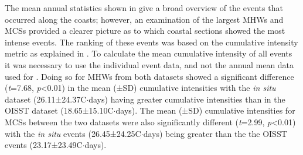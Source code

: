 \documentclass[a4paper,10pt,review]{elsarticle}
\begin{document}
The mean annual statistics shown in  give a broad overview of the events that occurred along the coasts; however, an examination of the largest MHWs and MCSs provided a clearer picture as to which coastal sections showed the most intense events. The ranking of these events was based on the cumulative intensity metric as explained in . To calculate the mean cumulative intensity of all events it was necessary to use the individual event data, and not the annual mean data used for . Doing so for MHWs from both datasets showed a significant difference (\emph{t}=7.68, \emph{p}<0.01) in the mean (±SD) cumulative intensities with the \emph{in situ} dataset (26.11±24.37\degree C$\cdot$days) having greater cumulative intensities than in the OISST dataset (18.65±15.10\degree C$\cdot$days). The mean (±SD) cumulative intensities for MCSs between the two datasets were also significantly different (\emph{t}=2.99, \emph{p}<0.01) with the \emph{in situ} events (26.45±24.25\degree C$\cdot$days) being greater than the the OISST events (23.17±23.49\degree C$\cdot$days).
\end{document}
